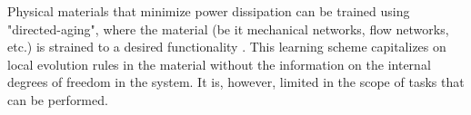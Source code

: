 \documentclass[%
 reprint,
 amsmath,amssymb,
 aps,
]{revtex4-2}
\begin{document}

    Physical materials that minimize power dissipation can be trained using "directed-aging", where the material (be it mechanical networks, flow networks, etc.) is strained to a desired functionality \cite{pashine2019directed, hexner2020effect}. This learning scheme capitalizes on local evolution rules in the material without the information on the internal degrees of freedom in the system. It is, however, limited in the scope of tasks that can be performed.
\end{document}
